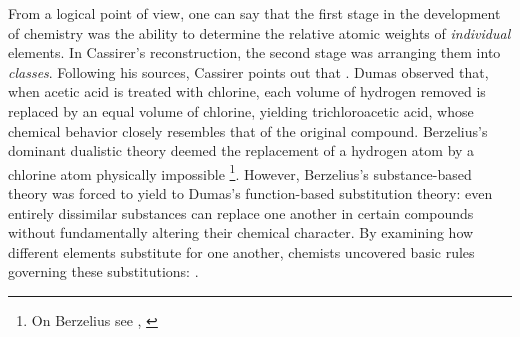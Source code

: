 \documentclass[submitted,12pt]{article}
\begin{document}
From a logical point of view, one can say that the first stage in the development of chemistry was the ability to determine the relative atomic weights of \emph{individual} elements. In Cassirer's reconstruction, the second stage was arranging them into \emph{classes}. Following his sources, Cassirer points out that  . Dumas observed that, when acetic acid is treated with chlorine, each volume of hydrogen removed is replaced by an equal volume of chlorine, yielding trichloroacetic acid, whose chemical behavior closely resembles that of the original compound. Berzelius's dominant dualistic theory deemed the replacement of a  hydrogen atom by a  chlorine atom physically impossible \footnote{On Berzelius see \citet[lect.~VI]{Ladenburg1902}, \citet[lect.~V]{Ostwald1906Leitlinien}}. However, Berzelius's substance-based theory was forced to yield to Dumas's function-based substitution theory: even entirely dissimilar substances can replace one another in certain compounds without fundamentally altering their chemical character. By examining how different elements substitute for one another, chemists uncovered basic rules governing these substitutions:  . 
\end{document}
